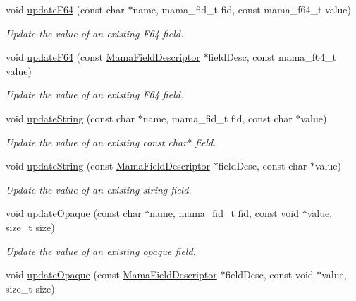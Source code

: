 \begin{DoxyCompactItemize}
void \hyperlink{classWombat_1_1MamaMsg_a31785ea2684eb01d023dae470f05c4b1}{updateF64} (const char $\ast$name, mama\_\-fid\_\-t fid, const mama\_\-f64\_\-t value)
\begin{DoxyCompactList}\small\item\em Update the value of an existing F64 field. \item\end{DoxyCompactList}\item 
void \hyperlink{classWombat_1_1MamaMsg_a314548c34f5d946a8a8a607daf1c7889}{updateF64} (const \hyperlink{classWombat_1_1MamaFieldDescriptor}{MamaFieldDescriptor} $\ast$fieldDesc, const mama\_\-f64\_\-t value)
\begin{DoxyCompactList}\small\item\em Update the value of an existing F64 field. \item\end{DoxyCompactList}\item 
void \hyperlink{classWombat_1_1MamaMsg_a16d653a54913e43bb11cbfcea247b867}{updateString} (const char $\ast$name, mama\_\-fid\_\-t fid, const char $\ast$value)
\begin{DoxyCompactList}\small\item\em Update the value of an existing const char$\ast$ field. \item\end{DoxyCompactList}\item 
void \hyperlink{classWombat_1_1MamaMsg_af7933f60c7c10d73524e6a2d5e5c7d20}{updateString} (const \hyperlink{classWombat_1_1MamaFieldDescriptor}{MamaFieldDescriptor} $\ast$fieldDesc, const char $\ast$value)
\begin{DoxyCompactList}\small\item\em Update the value of an existing string field. \item\end{DoxyCompactList}\item 
void \hyperlink{classWombat_1_1MamaMsg_ac59a35a3f35aead851372af2cba9dd97}{updateOpaque} (const char $\ast$name, mama\_\-fid\_\-t fid, const void $\ast$value, size\_\-t size)
\begin{DoxyCompactList}\small\item\em Update the value of an existing opaque field. \item\end{DoxyCompactList}\item 
void \hyperlink{classWombat_1_1MamaMsg_aab8feabfff6d06eec8650ea429d74089}{updateOpaque} (const \hyperlink{classWombat_1_1MamaFieldDescriptor}{MamaFieldDescriptor} $\ast$fieldDesc, const void $\ast$value, size\_\-t size)

\end{DoxyCompactItemize}
